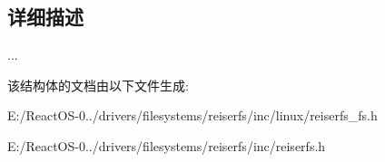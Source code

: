\subsection{详细描述}
... 

该结构体的文档由以下文件生成\+:\begin{DoxyCompactItemize}
\item 
E\+:/\+React\+O\+S-\/0../drivers/filesystems/reiserfs/inc/linux/reiserfs\+\_\+fs.\+h\item 
E\+:/\+React\+O\+S-\/0../drivers/filesystems/reiserfs/inc/reiserfs.\+h\end{DoxyCompactItemize}
